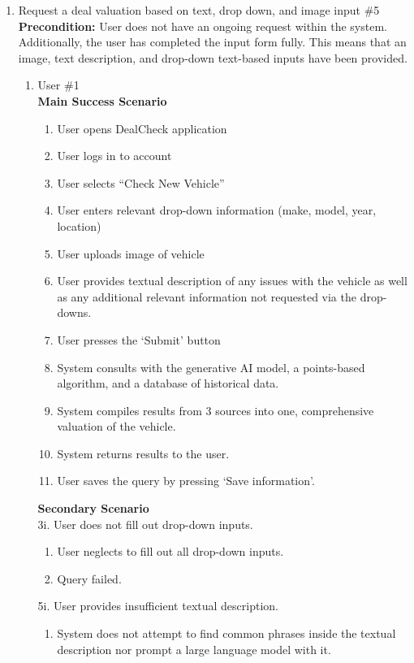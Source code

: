 \documentclass[]{article}
\begin{document}
\begin{enumerate}[{\bf {BE}1.}]
	\item Request a deal valuation based on text, drop down, and image input \#5 \\

	{\bf Precondition:} User does not have an ongoing request within the system. Additionally, 
	the user has completed the input form fully. This means that an image, 
	text description, and drop-down text-based inputs have been provided.
	\begin{enumerate}[{\bf VP1.}]
		\item User \#1 \\
		{\bf Main Success Scenario}
		\begin{enumerate}[1.]
			\item User opens DealCheck application
			\item User logs in to account
			\item User selects “Check New Vehicle”
			\item User enters relevant drop-down information (make, model, year, location)
			\item User uploads image of vehicle
			\item User provides textual description of any issues with the vehicle as well as any additional relevant information not requested via the drop-downs.
			\item User presses the ‘Submit’ button
			\item System consults with the generative AI model, a points-based algorithm, and a database of historical data.
			\item System compiles results from 3 sources into one, comprehensive valuation of the vehicle.
			\item System returns results to the user.
			\item User saves the query by pressing ‘Save information’.
		\end{enumerate}
		{\bf Secondary Scenario} \\
		3i. User does not fill out drop-down inputs.
		\begin{enumerate}[{3i}.1]
			\item User neglects to fill out all drop-down inputs.
			\item Query failed.
		\end{enumerate}
		5i. User provides insufficient textual description.
		\begin{enumerate}[{5i}.1]
			\item System does not attempt to find common phrases inside the textual description nor prompt a large language model with it.

\end{enumerate}
\end{enumerate}
\end{enumerate}
\end{document}
